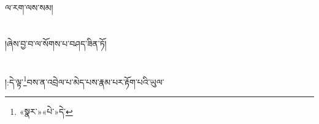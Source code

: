 ལ་རག་ལས་སམ།\chapter{ }།ཞེས་བྱ་བ་ལ་སོགས་པ་བཤད་ཟིན་ཏོ།\chapter{ }།:དེ་ལྟ་\footnote{«སྣར་»«པེ་»དེ་}བས་ན་འབྲེལ་པ་མེད་པས་རྣམ་པར་རྟོག་པའི་ཡུལ་